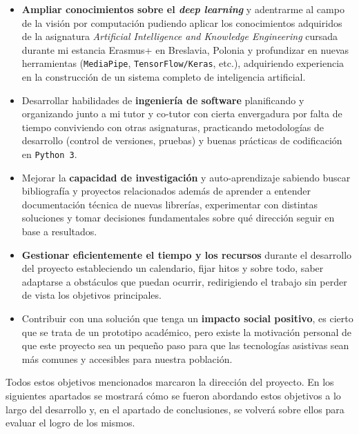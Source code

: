\begin{itemize}

    \item \textbf{Ampliar conocimientos sobre el \textit{deep learning}} y adentrarme al campo de la visión por computación pudiendo aplicar los conocimientos adquiridos de la asignatura \textit{Artificial Intelligence and Knowledge Engineering} cursada durante mi estancia Erasmus+ en Breslavia, Polonia y profundizar en nuevas herramientas (\texttt{MediaPipe}, \texttt{TensorFlow/Keras}, etc.), adquiriendo experiencia en la construcción de un sistema completo de inteligencia artificial.  

    \item Desarrollar habilidades de \textbf{ingeniería de software} planificando y organizando junto a mi tutor y co-tutor con cierta envergadura por falta de tiempo conviviendo con otras asignaturas, practicando metodologías de desarrollo (control de versiones, pruebas) y buenas prácticas de codificación en \texttt{Python 3}. 

    \item Mejorar la \textbf{capacidad de investigación} y auto-aprendizaje sabiendo buscar bibliografía y proyectos relacionados además de aprender a entender documentación técnica de nuevas librerías, experimentar con distintas soluciones y tomar decisiones fundamentales sobre qué dirección seguir en base a resultados.

    \item \textbf{Gestionar eficientemente el tiempo y los recursos} durante el desarrollo del proyecto estableciendo un calendario, fijar hitos y sobre todo, saber adaptarse a obstáculos que puedan ocurrir, redirigiendo el trabajo sin perder de vista los objetivos principales.

    \item Contribuir con una solución que tenga un \textbf{impacto social positivo}, es cierto que se trata de un prototipo académico, pero existe la motivación personal de que este proyecto sea un pequeño paso para que las tecnologías asistivas sean más comunes y accesibles para nuestra población.
\end{itemize}

Todos estos objetivos mencionados marcaron la dirección del proyecto. En los siguientes apartados se mostrará cómo se fueron abordando estos objetivos a lo largo del desarrollo y, en el apartado de conclusiones, se volverá sobre ellos para evaluar el logro de los mismos.

